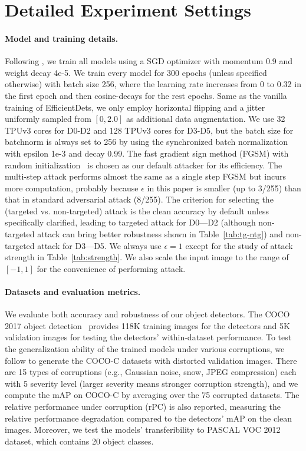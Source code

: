 \documentclass[final]{cvpr}
\begin{document}
\section{Detailed Experiment Settings}
\label{app:settings}
\paragraph{Model and training details.}
Following \cite{tan2020edet}, we train all models  using a SGD optimizer with momentum 0.9 and weight decay 4e-5.
We train every model for 300 epochs (unless specified otherwise) with batch size 256, where the learning rate increases from 0 to 0.32 in the first epoch and then cosine-decays for the rest epochs.
Same as the vanilla training of EfficientDets, we only employ horizontal flipping and a jitter uniformly sampled from $[0,2.0]$ as additional data augmentation.
We use 32 TPUv3 cores for D0-D2 and 128 TPUv3 cores for D3-D5, but the batch size for batchnorm is always set to 256 by using the synchronized batch normalization~\cite{peng2018megdet} with epsilon 1e-3 and decay 0.99.
The fast gradient sign method (FGSM) with random initialization~\cite{goodfellow2015fgsm} is chosen as our default attacker for its efficiency.
The multi-step attack performs almost the same as a single step FGSM but incurs more computation, probably because $\epsilon$ in this paper is smaller (up to 3/255) than that in standard adversarial attack (8/255).
The criterion for selecting the (targeted vs. non-targeted) attack is the clean accuracy by default unless specifically clarified, leading to targeted attack for D0---D2 (although non-targeted attack can bring better robustness shown in Table~\ref{tab:tg-ntg}) and non-targeted attack for D3---D5.
We always use $\epsilon=1$ except for the study of attack strength in Table~\ref{tab:strength}.
We also scale the input image to the range of $[-1, 1]$ for the convenience of performing attack.

\paragraph{Datasets and evaluation metrics.}
We evaluate both accuracy and robustness of our object detectors. The COCO 2017 object detection~\cite{lin2015coco} provides 118K training images for the detectors and 5K validation images for testing the detectors' within-dataset performance. 
To test the generalization ability of the trained models under various corruptions, we follow \cite{michaelis2020benchmarking} to generate the COCO-C datasets with distorted validation images.
There are 15 types of corruptions (e.g., Gaussian noise, snow, JPEG compression) each with 5 severity level (larger severity means stronger corruption strength), and we compute the mAP on COCO-C by averaging over the 75 corrupted datasets.
The relative performance under corruption (rPC) is also reported, measuring the relative performance degradation compared to the detectors' mAP on the clean images.
Moreover, we test the models' transferibility to PASCAL VOC 2012~\cite{pascal-voc-2012} dataset, which contains 20 object classes.
\end{document}
